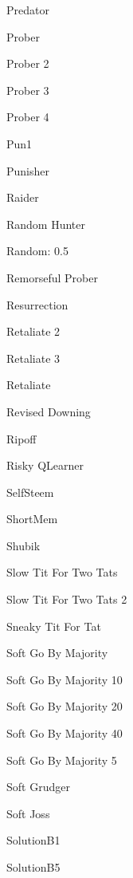 \item Predator~\cite{Ashlock2006}
\item Prober~\cite{Li2011}
\item Prober 2~\cite{prison}
\item Prober 3~\cite{prison}
\item Prober 4~\cite{prison}
\item Pun1~\cite{Ashlock2006}
\item Punisher~\cite{axelrodproject}
\item Raider~\cite{Ashlock2014}
\item Random Hunter~\cite{axelrodproject}
\item Random: 0.5~\cite{Axelrod1980a, Tzafestas2000}
\item Remorseful Prober~\cite{Li2011}
\item Resurrection~\cite{Eckhart2015}
\item Retaliate 2~\cite{axelrodproject}
\item Retaliate 3~\cite{axelrodproject}
\item Retaliate~\cite{axelrodproject}
\item Revised Downing~\cite{Axelrod1980a}
\item Ripoff~\cite{Ashlock2008}
\item Risky QLearner~\cite{axelrodproject}
\item SelfSteem~\cite{Andre2013}
\item ShortMem ~\cite{Andre2013}
\item Shubik~\cite{Axelrod1980a}
\item Slow Tit For Two Tats~\cite{axelrodproject}
\item Slow Tit For Two Tats 2~\cite{prison}
\item Sneaky Tit For Tat~\cite{axelrodproject}
\item Soft Go By Majority~\cite{Axelrod1981, Mittal2009}
\item Soft Go By Majority 10~\cite{axelrodproject}
\item Soft Go By Majority 20~\cite{axelrodproject}
\item Soft Go By Majority 40~\cite{axelrodproject}
\item Soft Go By Majority 5~\cite{axelrodproject}
\item Soft Grudger~\cite{Li2011}
\item Soft Joss~\cite{prison}
\item SolutionB1~\cite{Ashlock2015}
\item SolutionB5~\cite{Ashlock2015}
